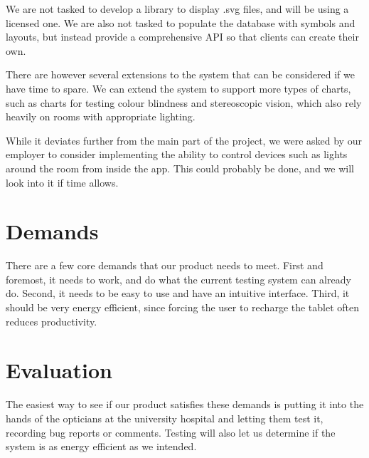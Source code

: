 \documentclass[12pt,a4paper,notitlepage]{report}
\begin{document}

We are not tasked to develop a library to display .svg files, and will be using a licensed one. We are also not tasked to populate the database with symbols and layouts, but instead provide a comprehensive API so that clients can create their own.


There are however several extensions to the system that can be considered if we have time to spare. We can extend the system to support more types of charts, such as charts for testing colour blindness and stereoscopic vision, which also rely heavily on rooms with appropriate lighting.

While it deviates further from the main part of the project, we were asked by our employer to consider implementing the ability to control devices such as lights around the room from inside the app. This could probably be done, and we will look into it if time allows.

\section{Demands}

There are a few core demands that our product needs to meet. First and foremost, it needs to work, and do what the current testing system can already do. Second, it needs to be easy to use and have an intuitive interface. Third, it should be very energy efficient, since forcing the user to recharge the tablet often reduces productivity. 

\section{Evaluation}

The easiest way to see if our product satisfies these demands is putting it into the hands of the opticians at the university hospital and letting them test it, recording bug reports or comments. Testing will also let us determine if the system is as energy efficient as we intended.



\end{document}
